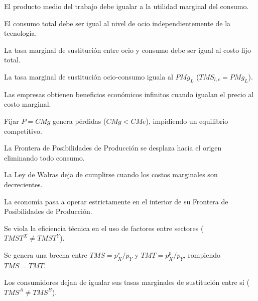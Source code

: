 \begin{opts}
    \item El producto medio del trabajo debe igualar a la utilidad marginal del consumo.
    \item El consumo total debe ser igual al nivel de ocio independientemente de la tecnología.
    \item La tasa marginal de sustitución entre ocio y consumo debe ser igual al costo fijo total.
    \item La tasa marginal de sustitución ocio-consumo iguala al $PMg_L$ ($TMS_{l,c} = PMg_L$).
\end{opts}

\begin{opts}
    \item Las empresas obtienen beneficios económicos infinitos cuando igualan el precio al costo marginal.
    \item Fijar $P = CMg$ genera pérdidas ($CMg < CMe$), impidiendo un equilibrio competitivo.
    \item La Frontera de Posibilidades de Producción se desplaza hacia el origen eliminando todo consumo.
    \item La Ley de Walras deja de cumplirse cuando los costos marginales son decrecientes.
\end{opts}

\begin{opts}
    \item La economía pasa a operar estrictamente en el interior de su Frontera de Posibilidades de Producción.
    \item Se viola la eficiencia técnica en el uso de factores entre sectores ($TMST^X \neq TMST^Y$).
    \item Se genera una brecha entre $TMS = p_X^c / p_Y$ y $TMT = p_X^p / p_Y$, rompiendo $TMS = TMT$.
    \item Los consumidores dejan de igualar sus tasas marginales de sustitución entre sí ($TMS^A \neq TMS^B$).
\end{opts}

